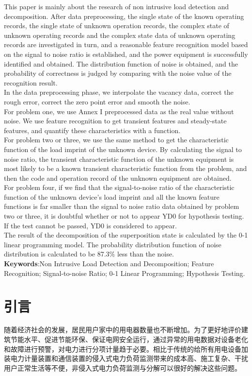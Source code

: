\documentclass[UTF8]{article}
\begin{document}
This paper is mainly about the research of non intrusive load detection and decomposition. After data preprocessing, the single state of the known operating records, the single state of unknown operation records, the complex state of unknown operating records and the complex state data of unknown operating records are investigated in turn, and a reasonable feature recognition model based on the signal to noise ratio is established, and the power equipment is successfully identified and obtained. The distribution function of noise is obtained, and the probability of correctness is judged by comparing with the noise value of the recognition result.\\
\indent In the data preprocessing phase, we interpolate the vacancy data, correct the rough error, correct the zero point error and smooth the noise.\\
\indent For problem one, we use Annex I preprocessed data as the real value without noise. We use feature recognition to get transient features and steady-state features, and quantify these characteristics with a function.\\
\indent For problem two or three, we use the same method to get the characteristic function of the load imprint of the unknown device. By calculating the signal to noise ratio, the transient characteristic function of the unknown equipment is most likely to be a known transient characteristic function from the problem, and then the code and operation record of the unknown equipment are obtained.\\
\indent For problem four, if we find that the signal-to-noise ratio of the characteristic function of the unknown device's load imprint and all the known feature functions is far smaller than the signal to noise ratio data obtained by problem two or three, it is doubtful whether or not to appear YD0 for hypothesis testing. If the test cannot be passed, YD0 is considered to appear.\\
\indent The result of the decomposition of the superposition state is calculated by the 0-1 linear programming model. The probability distribution function of noise distribution is calculated to be 87.3\% less than the noise. \\
\textbf{Keywords}:Non Intrusive Load Detection and Decomposition; Feature Recognition; Signal-to-noise Ratio; 0-1 Linear Programming; Hypothesis Testing.
\normalsize

\newpage
\thispagestyle{empty}
\tableofcontents
\newpage
\setcounter{page}{1}
\section{引言}
随着经济社会的发展，居民用户家中的用电器数量也不断增加。为了更好地评价建筑节能水平、促进节能环保、保证电网安全运行，通过异常的用电数据对设备老化和故障进行预警，对电力进行分项计量趋于必要。相比于传统的给所有用电设备加装电力计量装置和通信装置的侵入式电力负荷监测带来的成本高、施工复杂、干扰用户正常生活等不便，非侵入式电力负荷监测与分解可以很好的解决这些问题。
\end{document}
